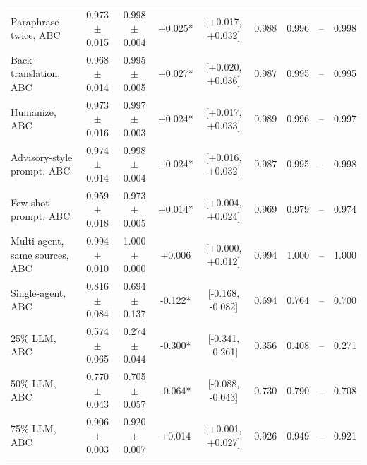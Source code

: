 \begin{table}[t]
\begin{tabular}{@{}lcccccccc@{}}
Paraphrase twice, ABC & 0.973$\pm$0.015 & 0.998$\pm$0.004 & +0.025* & [+0.017, +0.032] & 0.988 & 0.996 & -- & 0.998 \\
Back-translation, ABC & 0.968$\pm$0.014 & 0.995$\pm$0.005 & +0.027* & [+0.020, +0.036] & 0.987 & 0.995 & -- & 0.995 \\
Humanize, ABC & 0.973$\pm$0.016 & 0.997$\pm$0.003 & +0.024* & [+0.017, +0.033] & 0.989 & 0.996 & -- & 0.997 \\
Advisory-style prompt, ABC & 0.974$\pm$0.014 & 0.998$\pm$0.004 & +0.024* & [+0.016, +0.032] & 0.987 & 0.995 & -- & 0.998 \\
Few-shot prompt, ABC & 0.959$\pm$0.018 & 0.973$\pm$0.005 & +0.014* & [+0.004, +0.024] & 0.969 & 0.979 & -- & 0.974 \\
Multi-agent, same sources, ABC & 0.994$\pm$0.010 & 1.000$\pm$0.000 & +0.006 & [+0.000, +0.012] & 0.994 & 1.000 & -- & 1.000 \\
Single-agent, ABC & 0.816$\pm$0.084 & 0.694$\pm$0.137 & -0.122* & [-0.168, -0.082] & 0.694 & 0.764 & -- & 0.700 \\
25\% LLM, ABC & 0.574$\pm$0.065 & 0.274$\pm$0.044 & -0.300* & [-0.341, -0.261] & 0.356 & 0.408 & -- & 0.271 \\
50\% LLM, ABC & 0.770$\pm$0.043 & 0.705$\pm$0.057 & -0.064* & [-0.088, -0.043] & 0.730 & 0.790 & -- & 0.708 \\
75\% LLM, ABC & 0.906$\pm$0.003 & 0.920$\pm$0.007 & +0.014 & [+0.001, +0.027] & 0.926 & 0.949 & -- & 0.921 \\
\bottomrule
\end{tabular}
\end{table}

